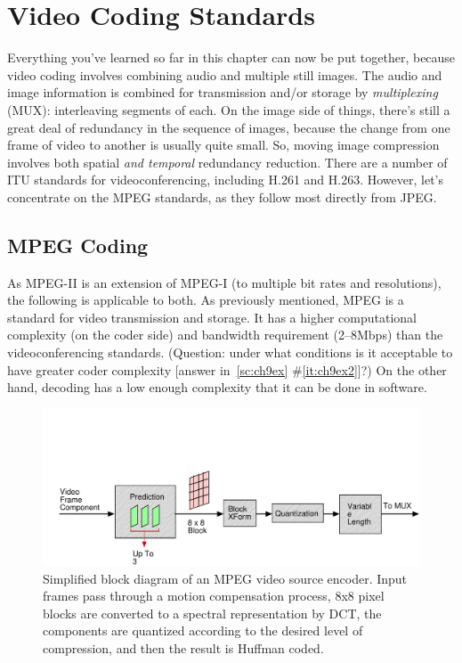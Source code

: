 \section{Video Coding Standards}

Everything you've learned so far in this chapter can now be put
together, because video coding involves combining audio and multiple
still images.  The audio and image information is combined for
transmission and/or storage by \emph{multiplexing} (MUX): interleaving
segments of each.  On the image side of things, there's still a great
deal of redundancy in the sequence of images, because the change from
one frame of video to another is usually quite small. So, moving image
compression involves both spatial \emph{and temporal} redundancy
reduction.  There are a number of ITU standards for videoconferencing,
including H.261 and H.263. However, let's concentrate on the MPEG
standards, as they follow most directly from JPEG.

\subsection{MPEG Coding}

As MPEG-II is an extension of MPEG-I (to multiple bit rates and
resolutions), the following is applicable to both. As previously
mentioned, MPEG is a standard for video transmission and storage. It
has a higher computational complexity (on the coder side) and
bandwidth requirement (2--8Mbps) than the videoconferencing
standards. (Question: under what conditions is it acceptable to have
greater coder complexity [answer in~\ref{sc:ch9ex}
\#\ref{it:ch9ex2}]?) On the other hand, decoding has a low enough
complexity that it can be done in software.

\begin{figure}
\centerline{\includegraphics[width=\textwidth]{ch-av/fig9-6}}
\caption[Simplified block diagram of an MPEG video source 
encoder]{Simplified block diagram of an MPEG video source
encoder. Input frames pass through a motion compensation process, 8x8
pixel blocks are converted to a spectral representation by DCT, the
components are quantized according to the desired level of
compression, and then the result is Huffman coded.\label{fg:mpeg}}
\end{figure}

